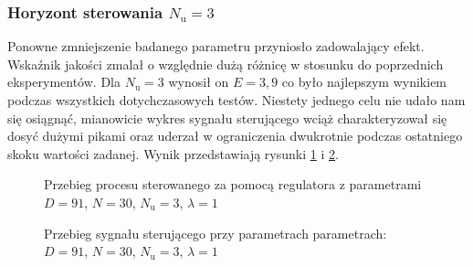 \subsubsection{Horyzont sterowania $N_{\mathrm{u}} = 3$}
Ponowne zmniejszenie badanego parametru przyniosło zadowalający efekt. Wskaźnik jakości zmalał o względnie dużą różnicę w stosunku do poprzednich eksperymentów. Dla $N_{\mathrm{u}} = 3$ wynosił on $E = 3,9$ co było najlepszym wynikiem podczas wszystkich dotychczasowych testów. Niestety jednego celu nie udało nam się osiągnąć, mianowicie wykres sygnału sterującego wciąż charakteryzował się dosyć dużymi pikami oraz uderzał w ograniczenia dwukrotnie podczas ostatniego skoku wartości zadanej. Wynik przedstawiają rysunki \ref{dmc_Nu_3_y} i \ref{dmc_Nu_3_u}.

\begin{figure}[t]
    \centering
    \caption{Przebieg procesu sterowanego za pomocą regulatora z parametrami $D = 91$, $N = 30$, $N_{\mathrm{u}} = 3$, $\lambda = 1$}
    \label{dmc_Nu_3_y}
\end{figure}

\begin{figure}[b]
    \centering
    \caption{Przebieg sygnału sterującego przy parametrach parametrach: $D = 91$, $N = 30$, $N_{\mathrm{u}} = 3$, $\lambda = 1$}
    \label{dmc_Nu_3_u}
\end{figure}

